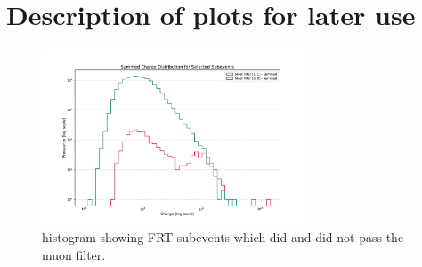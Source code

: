 \section{Description of plots for later use}
\begin{figure}
    \centering
    \includegraphics[width=0.7\textwidth]{Plots/frt_muon_filter_sub.pdf}
    \caption{histogram showing FRT-subevents which did and did not pass the muon filter.}
    \label{fig:frt_mu_sub}
\end{figure}

